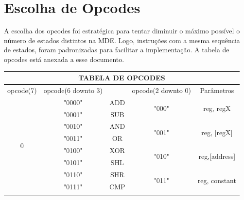 \documentclass[12pt]{article}
\begin{document}
\section{Escolha de Opcodes}
A escolha dos opcodes foi estratégica para tentar diminuir o máximo possível o número de estados distintos na MDE. Logo, instruções com a mesma sequência de estados, foram padronizadas para facilitar a implementação. A tabela de opcodes está anexada a esse documento.

\begin{table}[!htbp]
\centering
\begin{tabular}{|c|c|c|c|c}
\hline
\multicolumn{5}{|c|}{TABELA DE OPCODES}                                                                                                                 \\ \hline
opcode(7)           & opcode(6 downto 3)      &                      & opcode(2 downto 0)     & \multicolumn{1}{c|}{Parâmetros}                                   \\ \hline
\multirow{16}{*}{0} & "0000"                  & ADD                  & \multirow{2}{*}{"000"} & \multicolumn{1}{c|}{\multirow{2}{*}{reg, regX}}         \\ \cline{2-3}
                    & "0001"                  & SUB                  &                        & \multicolumn{1}{c|}{}                                   \\ \cline{2-5} 
                    & "0010"                  & AND                  & \multirow{2}{*}{"001"} & \multicolumn{1}{c|}{\multirow{2}{*}{reg, {[}regX{]}}}   \\ \cline{2-3}
                    & "0011"                  & OR                   &                        & \multicolumn{1}{c|}{}                                   \\ \cline{2-5} 
                    & "0100"                  & XOR                  & \multirow{2}{*}{"010"} & \multicolumn{1}{c|}{\multirow{2}{*}{reg,{[}address{]}}} \\ \cline{2-3}
                    & "0101"                  & SHL                  &                        & \multicolumn{1}{c|}{}                                   \\ \cline{2-5} 
                    & "0110"                  & SHR                  & \multirow{2}{*}{"011"} & \multicolumn{1}{c|}{\multirow{2}{*}{reg, constant}}     \\ \cline{2-3}
                    & "0111"                  & CMP                  &                        & \multicolumn{1}{c|}{}                                   \\ \cline{2-5} 

\end{tabular}
\end{table}
\end{document}
